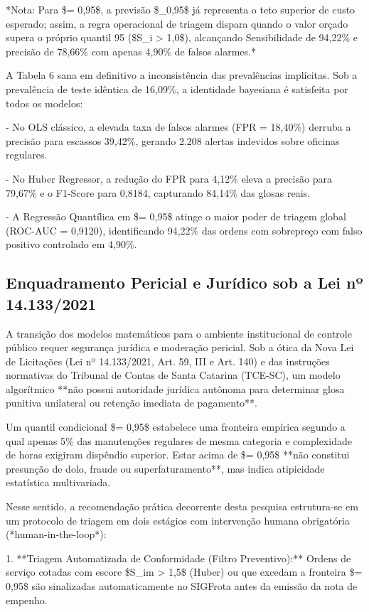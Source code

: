 \documentclass[12pt,a4paper]{article}
\begin{document}
*\*Nota: Para \$\tau = 0,95\$, a previsão \$\_{0,95}\$ já representa o teto superior de custo esperado; assim, a regra operacional de triagem dispara quando o valor orçado supera o próprio quantil 95 (\$S\_i > 1,0\$), alcançando Sensibilidade de 94,22\% e precisão de 78,66\% com apenas 4,90\% de falsos alarmes.*

A Tabela 6 sana em definitivo a inconsistência das prevalências implícitas. Sob a prevalência de teste idêntica de 16,09\%, a identidade bayesiana é satisfeita por todos os modelos:

- No OLS clássico, a elevada taxa de falsos alarmes (FPR = 18,40\%) derruba a precisão para escassos 39,42\%, gerando 2.208 alertas indevidos sobre oficinas regulares.

- No Huber Regressor, a redução do FPR para 4,12\% eleva a precisão para 79,67\% e o F1-Score para 0,8184, capturando 84,14\% das glosas reais.

- A Regressão Quantílica em \$\tau = 0,95\$ atinge o maior poder de triagem global (ROC-AUC = 0,9120), identificando 94,22\% das ordens com sobrepreço com falso positivo controlado em 4,90\%.


\subsection{Enquadramento Pericial e Jurídico sob a Lei nº 14.133/2021}

A transição dos modelos matemáticos para o ambiente institucional de controle público requer segurança jurídica e moderação pericial. Sob a ótica da Nova Lei de Licitações (Lei nº 14.133/2021, Art. 59, III e Art. 140) e das instruções normativas do Tribunal de Contas de Santa Catarina (TCE-SC), um modelo algorítmico **não possui autoridade jurídica autônoma para determinar glosa punitiva unilateral ou retenção imediata de pagamento**.

Um quantil condicional \$\tau = 0,95\$ estabelece uma fronteira empírica segundo a qual apenas 5\% das manutenções regulares de mesma categoria e complexidade de horas exigiram dispêndio superior. Estar acima de \$\tau = 0,95\$ **não constitui presunção de dolo, fraude ou superfaturamento**, mas indica atipicidade estatística multivariada.

Nesse sentido, a recomendação prática decorrente desta pesquisa estrutura-se em um protocolo de triagem em dois estágios com intervenção humana obrigatória (*human-in-the-loop*):

1. **Triagem Automatizada de Conformidade (Filtro Preventivo):** Ordens de serviço cotadas com escore \$S\_{im} > 1,5\$ (Huber) ou que excedam a fronteira \$\tau = 0,95\$ são sinalizadas automaticamente no SIGFrota antes da emissão da nota de empenho.
\end{document}
